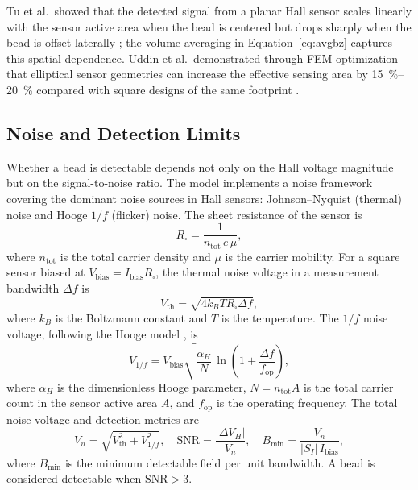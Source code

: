 \documentclass[biosensors,article,submit,pdftex,moreauthors]{Definitions/mdpi}
\begin{document}
Tu et al.\ showed that the detected signal from a planar Hall sensor scales linearly
with the sensor active area when the bead is centered but drops sharply when the
bead is offset laterally \cite{tu2009}; the volume averaging in
Equation~\eqref{eq:avgbz} captures this spatial dependence. Uddin et al.\
demonstrated through FEM optimization that elliptical sensor geometries can increase
the effective sensing area by \SIrange{15}{20}{\percent} compared with square
designs of the same footprint \cite{uddin2022}.

\subsection{Noise and Detection Limits}
\label{sec:noise}

Whether a bead is detectable depends not only on the Hall voltage magnitude but on
the signal-to-noise ratio. The model implements a noise framework covering the
dominant noise sources in Hall sensors: Johnson--Nyquist (thermal) noise and Hooge
$1/f$ (flicker) noise. The sheet resistance of the sensor is
\begin{equation}
R_\square = \frac{1}{n_\text{tot} \, e \, \mu},
\label{eq:rsq}
\end{equation}
where $n_\text{tot}$ is the total carrier density and $\mu$ is the carrier mobility.
For a square sensor biased at $V_\text{bias} = I_\text{bias} R_\square$, the thermal
noise voltage in a measurement bandwidth $\Delta f$ is
\begin{equation}
V_\text{th} = \sqrt{4 k_B T R_\square \Delta f},
\label{eq:thermal}
\end{equation}
where $k_B$ is the Boltzmann constant and $T$ is the temperature. The $1/f$ noise
voltage, following the Hooge model \cite{xu2013,huang2014}, is
\begin{equation}
V_{1/f} = V_\text{bias}\sqrt{\frac{\alpha_H}{N}\,
\ln\!\left(1 + \frac{\Delta f}{f_\text{op}}\right)},
\label{eq:flicker}
\end{equation}
where $\alpha_H$ is the dimensionless Hooge parameter,
$N = n_\text{tot} A$ is the total carrier count in the sensor active area $A$, and
$f_\text{op}$ is the operating frequency. The total noise voltage and detection
metrics are
\begin{equation}
V_n = \sqrt{V_\text{th}^2 + V_{1/f}^2}, \quad
\text{SNR} = \frac{|\Delta V_H|}{V_n}, \quad
B_\text{min} = \frac{V_n}{|S_I| \, I_\text{bias}},
\label{eq:snr}
\end{equation}
where $B_\text{min}$ is the minimum detectable field per unit bandwidth. A bead is
considered detectable when $\text{SNR} > 3$.
\end{document}
